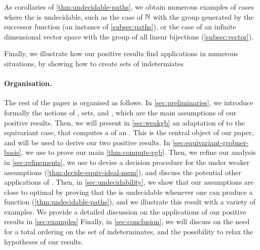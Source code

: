 As corollaries of
\cref{thm:undecidable-paths},
we obtain numerous examples of cases where the  is undecidable, such as the case of $\mathbb{N}$ with the group generated by
the successor function (an instance of
\cref{subsec:paths}), or the case of an
infinite dimensional vector space with the group of all linear bijections
(\cref{subsec:vector}). 

Finally, we illustrate how our positive results find applications in 
numerous situations, by showing how to create sets of indetermiates 

\paragraph{Organisation.} \AP The rest of the paper is organised as follows. In
\cref{sec:preliminaries}, we introduce formally the
notions of ,  sets, and
, which are the main assumptions of our positive
results. Then, we will present in \cref{sec:weakgb}
an adaptation of  to the equivariant case, that computes a  of an . This is the central object of our
paper, and will be used to derive our two positive results. In
\cref{sec:equivariant-grobner-basis},
we use  to prove our main
\cref{thm:compute-egb}.
Then, we refine our analysis in
\cref{sec:refinements},
we use  to devise a decision procedure for
the  under weaker assumptions
(\cref{thm:decide-equiv-ideal-mem}),
and discuss the potential other applications of . Then, in
\cref{sec:undecidability}, we show that
our assumptions are close to optimal by proving that the  is undecidable whenever one can produce a  function (\cref{thm:undecidable-paths}), and we
illustrate this result with a variety of examples. We provide a detailed
discussion on the applications of our positive results in \cref{sec:examples}
Finally, in \cref{sec:conclusion}, we will
discuss on the need for a total ordering on the set of indeterminates, and the
possibility to relax the hypotheses of our results.

